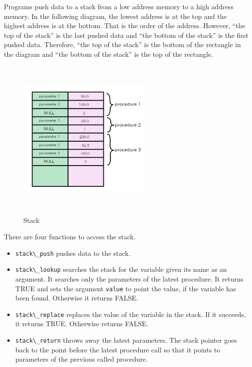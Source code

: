 Programs push data to a stack from a low address memory to a high
address memory. In the following diagram, the lowest address is at the
top and the highest address is at the bottom. That is the order of the
address. However, ``the top of the stack'' is the last pushed data and
``the bottom of the stack'' is the first pushed data. Therefore, ``the
top of the stack'' is the bottom of the rectangle in the diagram and
``the bottom of the stack'' is the top of the rectangle.

\begin{figure}
\centering
\includegraphics[width=6.64cm,height=8.05cm]{../image/stack.png}
\caption{Stack}
\end{figure}

There are four functions to access the stack.

\begin{itemize}
\tightlist
\item
  \passthrough{\lstinline!stack\_push!} pushes data to the stack.
\item
  \passthrough{\lstinline!stack\_lookup!} searches the stack for the
  variable given its name as an argument. It searches only the
  parameters of the latest procedure. It returns TRUE and sets the
  argument \passthrough{\lstinline!value!} to point the value, if the
  variable has been found. Otherwise it returns FALSE.
\item
  \passthrough{\lstinline!stack\_replace!} replaces the value of the
  variable in the stack. If it succeeds, it returns TRUE. Otherwise
  returns FALSE.
\item
  \passthrough{\lstinline!stack\_return!} throws away the latest
  parameters. The stack pointer goes back to the point before the latest
  procedure call so that it points to parameters of the previous called
  procedure.
\end{itemize}

